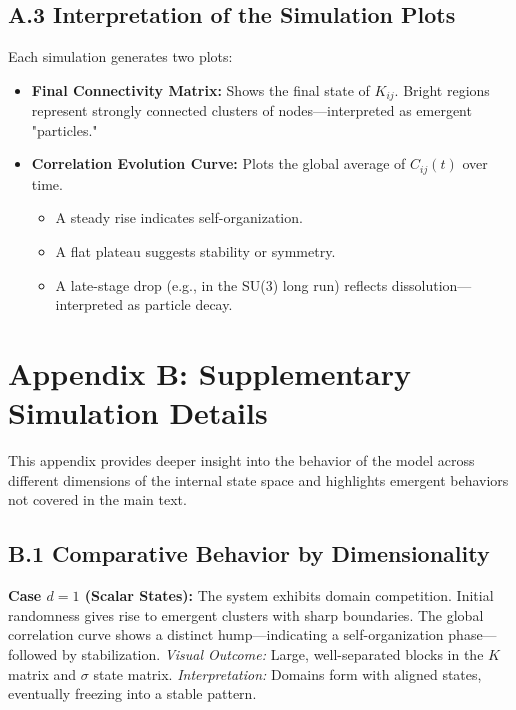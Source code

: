 \documentclass[12pt]{article}
\begin{document}
\vspace{1em}

\subsection*{A.3 Interpretation of the Simulation Plots}

Each simulation generates two plots:

\begin{itemize}
\item \textbf{Final Connectivity Matrix:} Shows the final state of $K_{ij}$. Bright regions represent strongly connected clusters of nodes—interpreted as emergent "particles."
\item \textbf{Correlation Evolution Curve:} Plots the global average of $C_{ij}(t)$ over time.
  \begin{itemize}
    \item A steady rise indicates self-organization.
    \item A flat plateau suggests stability or symmetry.
    \item A late-stage drop (e.g., in the SU(3) long run) reflects dissolution—interpreted as particle decay.
  \end{itemize}
\end{itemize}


\section*{Appendix B: Supplementary Simulation Details}

This appendix provides deeper insight into the behavior of the model across different dimensions of the internal state space and highlights emergent behaviors not covered in the main text.

\subsection*{B.1 Comparative Behavior by Dimensionality}

\textbf{Case $d=1$ (Scalar States):}  
The system exhibits domain competition. Initial randomness gives rise to emergent clusters with sharp boundaries. The global correlation curve shows a distinct hump—indicating a self-organization phase—followed by stabilization.  
\textit{Visual Outcome:} Large, well-separated blocks in the $K$ matrix and $\sigma$ state matrix.  
\textit{Interpretation:} Domains form with aligned states, eventually freezing into a stable pattern.
\end{document}

